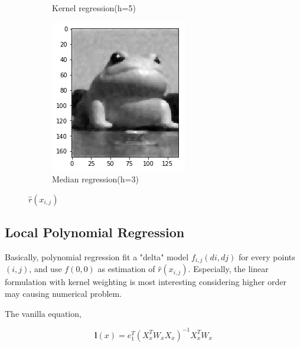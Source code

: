\documentclass{article}
\begin{document}
\begin{figure}[htb]
\begin{subfigure}[b]{0.24\linewidth}
    \caption{Kernel regression(h=5)}
  \end{subfigure}
  \begin{subfigure}[b]{0.24\linewidth}
    \includegraphics[width=\linewidth]{images/noise_removal_4.png}
    \caption{Median regression(h=3)}
  \end{subfigure}
  \caption{$\hat{r}(x_{i,j})$}
  \label{fig:effect_noise_removal}
\end{figure}


\subsection{Local Polynomial Regression}

Basically, polynomial regression fit a "delta" model $f_{i,j}(di,dj)$ for every points $(i,j)$, and use $f(0,0)$
as estimation of $\hat{r}(x_{i,j})$. Especially, the linear formulation with kernel weighting is most 
interesting considering higher order may causing numerical problem.

The vanilla equation,

$$
\mathbf{l}(x) = e_1^T (X_x^T W_x X_x)^{-1} X_x^T W_x
$$
\end{document}
